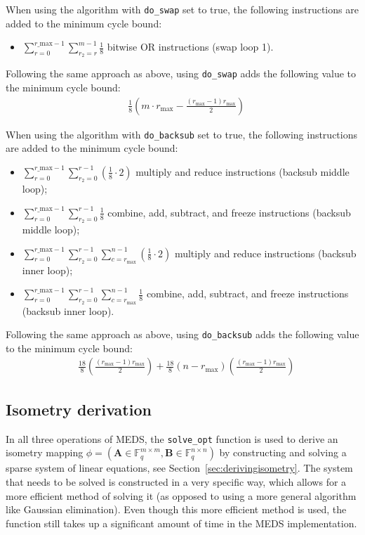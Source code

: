 \documentclass[11pt,a4paper]{report}
\theoremstyle{definition}
\begin{document}
When using the algorithm with \texttt{do\_swap} set to true, the following instructions are added to the minimum cycle bound:
\begin{itemize}
  \item $\sum_{r=0}^{r\_\text{max}-1} \sum_{r_2=r}^{m-1} \frac{1}{8}$ bitwise OR instructions (swap loop 1).
\end{itemize}
Following the same approach as above, using \texttt{do\_swap} adds the following value to the minimum cycle bound:
\begin{align*}
   & \frac{1}{8} \left( m \cdot r_\text{max} - \frac{(r_\text{max} - 1)r_{\text{max}}}{2} \right)
\end{align*}

When using the algorithm with \texttt{do\_backsub} set to true, the following instructions are added to the minimum cycle bound:
\begin{itemize}
  \item $\sum_{r=0}^{r\_\text{max}-1} \sum_{r_2=0}^{r-1} (\frac{1}{8} \cdot 2)$ multiply and reduce instructions (backsub middle loop);
  \item $\sum_{r=0}^{r\_\text{max}-1} \sum_{r_2=0}^{r-1} \frac{1}{8}$ combine, add, subtract, and freeze instructions (backsub middle loop);
  \item $\sum_{r=0}^{r\_\text{max}-1} \sum_{r_2=0}^{r-1} \sum_{c=r_\text{max}}^{n-1} (\frac{1}{8} \cdot 2)$ multiply and reduce instructions (backsub inner loop);
  \item $\sum_{r=0}^{r\_\text{max}-1} \sum_{r_2=0}^{r-1} \sum_{c=r_\text{max}}^{n-1} \frac{1}{8}$ combine, add, subtract, and freeze instructions (backsub inner loop).
\end{itemize}
Following the same approach as above, using \texttt{do\_backsub} adds the following value to the minimum cycle bound:
\begin{align*}
   & \frac{18}{8} \left( \frac{(r_\text{max} - 1)r_{\text{max}}}{2} \right) + \frac{18}{8} \left( n - r_\text{max} \right) \left( \frac{(r_\text{max} - 1)r_{\text{max}}}{2} \right)
\end{align*}

\subsection{Isometry derivation}
\label{sec:isometryderivation}
In all three operations of MEDS, the \texttt{solve\_opt} function is used to derive an isometry mapping $\phi = (\textbf{A} \in \mathbb{F}_q^{m \times m}, \textbf{B} \in \mathbb{F}_q^{n \times n})$ by constructing and solving a sparse system of linear equations, see Section~\ref{sec:derivingisometry}. The system that needs to be solved is constructed in a very specific way, which allows for a more efficient method of solving it (as opposed to using a more general algorithm like Gaussian elimination). Even though this more efficient method is used, the function still takes up a significant amount of time in the MEDS implementation.
\end{document}
